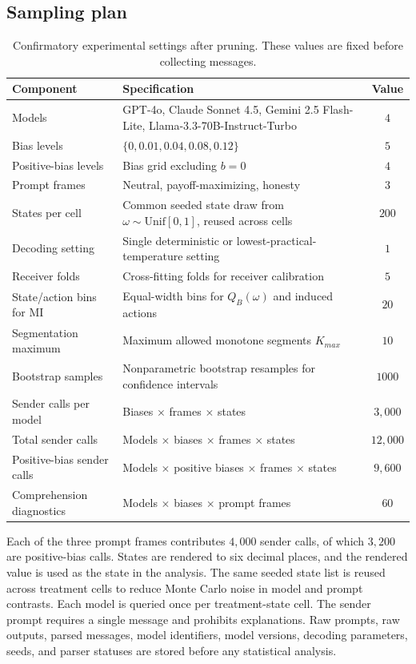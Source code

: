 \documentclass[11pt]{article}
\begin{document}
\subsection{Sampling plan}

\begin{table}[H]
\centering
\small
\caption{Confirmatory experimental settings after pruning.  These values are fixed before collecting messages.}
\label{tab:settings}
\begin{tabularx}{\linewidth}{lYc}
\toprule
Component & Specification & Value \\
\midrule
Models & GPT-4o, Claude Sonnet 4.5, Gemini 2.5 Flash-Lite, Llama-3.3-70B-Instruct-Turbo & $4$ \\
Bias levels & $\{0,0.01,0.04,0.08,0.12\}$ & $5$ \\
Positive-bias levels & Bias grid excluding $b=0$ & $4$ \\
Prompt frames & Neutral, payoff-maximizing, honesty & $3$ \\
States per cell & Common seeded state draw from $\omega\sim\mathrm{Unif}[0,1]$, reused across cells & $200$ \\
Decoding setting & Single deterministic or lowest-practical-temperature setting & $1$ \\
Receiver folds & Cross-fitting folds for receiver calibration & $5$ \\
State/action bins for MI & Equal-width bins for $Q_B(\omega)$ and induced actions & $20$ \\
Segmentation maximum & Maximum allowed monotone segments $K_{max}$ & $10$ \\
Bootstrap samples & Nonparametric bootstrap resamples for confidence intervals & $1000$ \\
Sender calls per model & Biases $\times$ frames $\times$ states & $3{,}000$ \\
Total sender calls & Models $\times$ biases $\times$ frames $\times$ states & $12{,}000$ \\
Positive-bias sender calls & Models $\times$ positive biases $\times$ frames $\times$ states & $9{,}600$ \\
Comprehension diagnostics & Models $\times$ biases $\times$ prompt frames & $60$ \\
\bottomrule
\end{tabularx}
\end{table}

Each of the three prompt frames contributes $4{,}000$ sender calls, of which $3{,}200$ are positive-bias calls.  States are rendered to six decimal places, and the rendered value is used as the state in the analysis.  The same seeded state list is reused across treatment cells to reduce Monte Carlo noise in model and prompt contrasts.  Each model is queried once per treatment-state cell.  The sender prompt requires a single message and prohibits explanations.  Raw prompts, raw outputs, parsed messages, model identifiers, model versions, decoding parameters, seeds, and parser statuses are stored before any statistical analysis.
\end{document}
